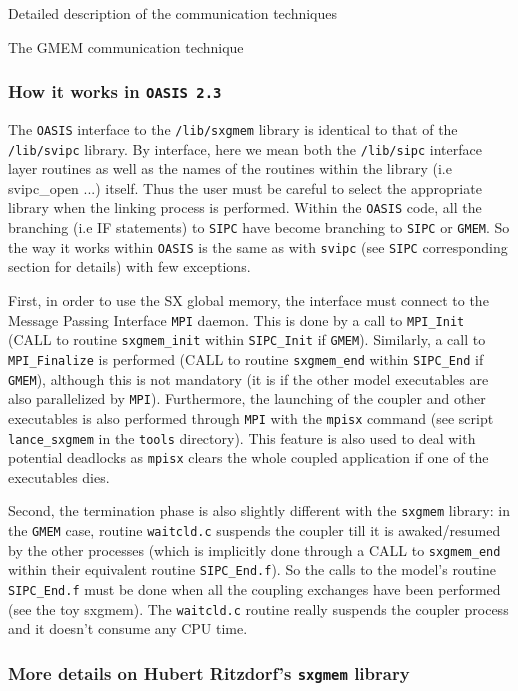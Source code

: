 \begin{section}{Detailed description of the communication techniques}
\begin{subsection}{The GMEM communication technique}
\subsubsection{How it works in {\tt OASIS 2.3}}

The {\tt OASIS} interface to the {\tt /lib/sxgmem} library is identical 
to that of the {\tt /lib/svipc} library. By interface, here we mean both 
the {\tt /lib/sipc} interface layer routines as well as
the names of the routines within the library (i.e svipc\_open ...) itself.
Thus the user must be careful to select the appropriate library 
when the linking process is performed. Within the
{\tt OASIS} code, all the branching (i.e IF statements) to {\tt SIPC} 
have become branching to {\tt SIPC} or {\tt GMEM}.
So the way it works within {\tt OASIS} is the same as with {\tt svipc}
(see {\tt SIPC} corresponding section for details) with few exceptions.

First, in order to use the SX global memory, the interface must connect
to the Message Passing Interface {\tt MPI} daemon. 
This is done by a call to {\tt MPI\_Init} (CALL to 
routine {\tt sxgmem\_init} within {\tt SIPC\_Init} if {\tt GMEM}). 
Similarly, a call to {\tt MPI\_Finalize} is performed (CALL to routine 
{\tt sxgmem\_end} within {\tt SIPC\_End} if {\tt GMEM}), although this is 
not mandatory (it is if the
other model executables are also parallelized by {\tt MPI}). Furthermore,
the launching of the coupler and other executables is also performed
through {\tt MPI} with the {\tt mpisx} command (see script {\tt lance\_sxgmem}
 in the {\tt tools} directory). This feature is also used to deal with 
potential deadlocks as {\tt mpisx} clears the whole coupled application 
if one of the executables dies.

Second, the termination phase is also slightly different with the 
{\tt sxgmem} library: in the {\tt GMEM} case, routine {\tt waitcld.c} 
suspends the coupler till it is awaked/resumed
by the other processes (which is implicitly done through a CALL to 
{\tt sxgmem\_end} within their equivalent routine {\tt SIPC\_End.f}).
So the calls to the model's routine {\tt SIPC\_End.f} must be done when
all the coupling exchanges have been performed (see the toy sxgmem).
The {\tt waitcld.c} routine really
suspends the coupler process and it doesn't consume any CPU time.

\subsubsection{More details on Hubert Ritzdorf's {\tt sxgmem} library}


\end{subsection}
\end{section}
